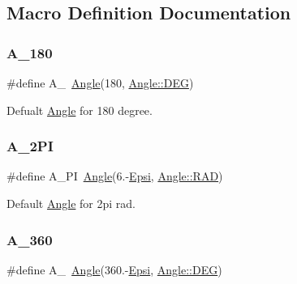 \subsection{Macro Definition Documentation}
\mbox{\label{maths_8hh_ac37f3aecadc99641dd1c8b4c81d96f7e}} 
\subsubsection{\texorpdfstring{A\_180}{A\_180}}
{\footnotesize\ttfamily \#define A\+\_~\mbox{\hyperlink{class_angle}{Angle}}(180, \mbox{\hyperlink{class_angle_a4f7b9849ce8780bcba95ca3ee45cff77a65e2aa4bc05730c9c2e8fdaf73612282}{Angle\+::\+D\+EG}})}



Defualt \mbox{\hyperlink{class_angle}{Angle}} for 180 degree. 

\mbox{\label{maths_8hh_ad7760000c41920a1ae5cf0f6bf0e4c77}} 
\subsubsection{\texorpdfstring{A\_2PI}{A\_2PI}}
{\footnotesize\ttfamily \#define A\+\_\+PI~\mbox{\hyperlink{class_angle}{Angle}}(6.-\/\mbox{\hyperlink{maths_8hh_a78802b279ab85021d7f6bffe51621703}{Epsi}}, \mbox{\hyperlink{class_angle_a4f7b9849ce8780bcba95ca3ee45cff77a93ab6b68075fd7a6fe724fbde5b13c1f}{Angle\+::\+R\+AD}})}



Default \mbox{\hyperlink{class_angle}{Angle}} for 2pi rad. 

\mbox{\label{maths_8hh_ae46eba4b5423f51b80f3446e128c6476}} 
\subsubsection{\texorpdfstring{A\_360}{A\_360}}
{\footnotesize\ttfamily \#define A\+\_~\mbox{\hyperlink{class_angle}{Angle}}(360.-\/\mbox{\hyperlink{maths_8hh_a78802b279ab85021d7f6bffe51621703}{Epsi}}, \mbox{\hyperlink{class_angle_a4f7b9849ce8780bcba95ca3ee45cff77a65e2aa4bc05730c9c2e8fdaf73612282}{Angle\+::\+D\+EG}})}



